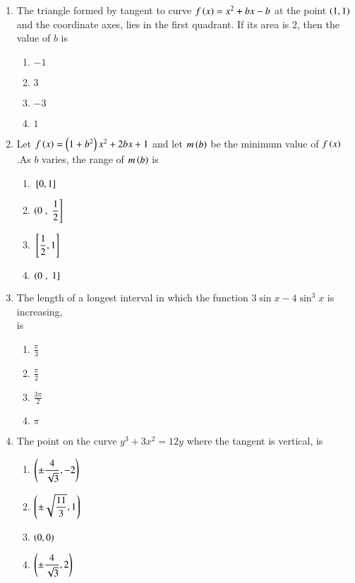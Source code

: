 \documentclass[journal,12pt,twocolumn]{IEEEtran}
\theoremstyle{remark}
\begin{document}
\begin{enumerate}[start=9]
\item The triangle formed by tangent to curve $f\left(x\right)=x^2+bx-b$ at the point $\left(1,1\right)$ and the coordinate axes, lies in the first quadrant. If its area is $2$, then the value of $b$ is 
\hfill {}
\begin{enumerate}
    \item $-1$
    \item $3$ 
    \item $-3$
    \item $1$\\
\end{enumerate}
\item Let $f\left(x\right)=\left(1+b^2\right)x^2+2bx+1$ and let $m\left(b\right)$ be the minimum value of $f\left(x\right)$.As $b$ varies, the range of $m\left(b\right)$ is 
\hfill {}
\begin{enumerate}
	\item ${}\left[0,1\right]$\\
	\item $\left(0\right.,{}\left.\displaystyle\frac{1}{2}\right]$\\
	\item ${}\left[\displaystyle\frac{1}{2},1\right]$\\
	\item $\left(0\right.,{}\left.1\right]$\\
\end{enumerate}
\item The length of a longest interval in which the function $3 \sin{x}-4\sin^3{x}$ is increasing,\\
is \hfill {}
\begin{enumerate}
    \item $\displaystyle\frac{\pi}{3}$\\
    \item $\displaystyle\frac{\pi}{2}$\\
    \item $\displaystyle\frac{3\pi}{2}$\\
    \item $\pi$
\end{enumerate}
\item The point on the curve $y^3+3x^2=12y$ where the tangent is vertical, is
\hfill {}\\
\begin{enumerate}
	\item $\left(\pm \displaystyle\frac{4}{\sqrt{3}},-2\right)$\\
	\item $\left(\pm\sqrt{\displaystyle\frac{11}{3}},1\right)$\\
	\item $\left(0,0\right)$\\
	\item $\left(\pm \displaystyle\frac{4}{\sqrt{3}},2\right)$\\\\
\end{enumerate}


\end{enumerate}
\end{document}
